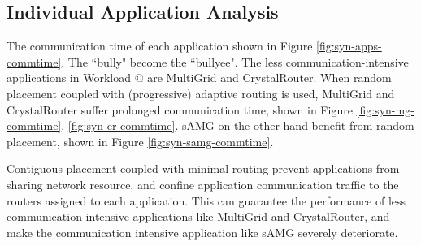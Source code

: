 \documentclass[conference,compsoc]{IEEEtran}
\makeatletter
\newcommand{\Rmnum}[1]{\expandafter\@slowromancap\romannumeral #1@}
\makeatother
\begin{document}
\subsection{Individual Application Analysis}

The communication time of each application shown in Figure \ref{fig:syn-apps-commtime}. The ``bully" become the ``bullyee". The less communication-intensive applications in Workload \Rmnum{2} are  MultiGrid and CrystalRouter.  When random placement coupled with (progressive) adaptive routing is used, MultiGrid and CrystalRouter suffer prolonged communication time, shown in Figure \ref{fig:syn-mg-commtime}, \ref{fig:syn-cr-commtime}. sAMG on the other hand benefit from random placement, shown in Figure \ref{fig:syn-samg-commtime}. 

Contiguous placement coupled with minimal routing prevent applications from sharing network resource, and confine application communication traffic to the routers assigned to each application. This can guarantee the performance of less communication intensive applications like MultiGrid and CrystalRouter, and make the communication intensive application like sAMG severely deteriorate. 
\end{document}
